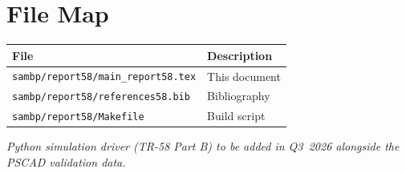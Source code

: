 \documentclass[11pt,a4paper]{article}
\begin{document}
\appendix
\section{File Map}
\label{app:files}

\begin{tabular}{ll}
  \toprule
  File & Description \\
  \midrule
  \texttt{sambp/report58/main\_report58.tex} & This document \\
  \texttt{sambp/report58/references58.bib}   & Bibliography \\
  \texttt{sambp/report58/Makefile}           & Build script \\
  \bottomrule
\end{tabular}

\noindent\textit{Python simulation driver (TR-58 Part B) to be added
  in Q3~2026 alongside the PSCAD validation data.}



\end{document}
